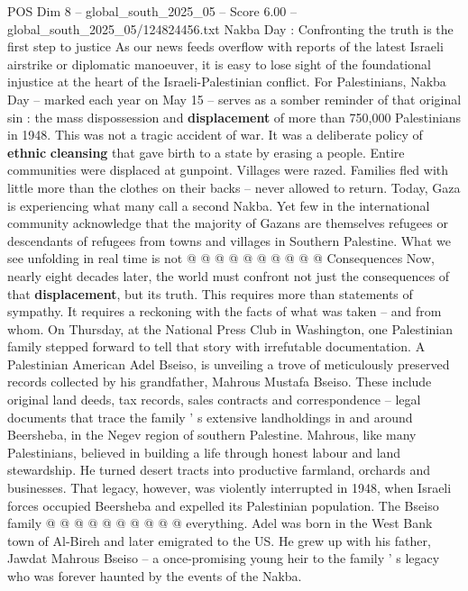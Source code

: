 \begin{textsample}{POS Dim 8 – global\_south\_2025\_05 – Score 6.00 – global\_south\_2025\_05/124824456.txt}  \label{ex:f8_pos_132}
Nakba Day : Confronting the truth is the first step to justice As our news feeds overflow with reports of the latest Israeli airstrike or diplomatic manoeuver, it is easy to lose sight of the foundational injustice at the heart of the Israeli-Palestinian conflict.
For Palestinians, Nakba Day -- marked each year on May 15 -- serves as a somber reminder of that original sin : the mass dispossession and \textbf{displacement} of more than 750,000 Palestinians in 1948.
This was not a tragic accident of war.
It was a deliberate policy of \textbf{ethnic} \textbf{cleansing} that gave birth to a state by erasing a people.
Entire communities were displaced at gunpoint.
Villages were razed.
Families fled with little more than the clothes on their backs -- never allowed to return.
Today, Gaza is experiencing what many call a second Nakba.
Yet few in the international community acknowledge that the majority of Gazans are themselves refugees or descendants of refugees from towns and villages in Southern Palestine.
What we see unfolding in real time is not @ @ @ @ @ @ @ @ @ @ Consequences Now, nearly eight decades later, the world must confront not just the consequences of that \textbf{displacement}, but its truth.
This requires more than statements of sympathy.
It requires a reckoning with the facts of what was taken -- and from whom.
On Thursday, at the National Press Club in Washington, one Palestinian family stepped forward to tell that story with irrefutable documentation.
A Palestinian American Adel Bseiso, is unveiling a trove of meticulously preserved records collected by his grandfather, Mahrous Mustafa Bseiso.
These include original land deeds, tax records, sales contracts and correspondence -- legal documents that trace the family ' s extensive landholdings in and around Beersheba, in the Negev region of southern Palestine.
Mahrous, like many Palestinians, believed in building a life through honest labour and land stewardship.
He turned desert tracts into productive farmland, orchards and businesses.
That legacy, however, was violently interrupted in 1948, when Israeli forces occupied Beersheba and expelled its Palestinian population.
The Bseiso family @ @ @ @ @ @ @ @ @ @ everything.
Adel was born in the West Bank town of Al-Bireh and later emigrated to the US.
He grew up with his father, Jawdat Mahrous Bseiso -- a once-promising young heir to the family ' s legacy who was forever haunted by the events of the Nakba.

\end{textsample}
